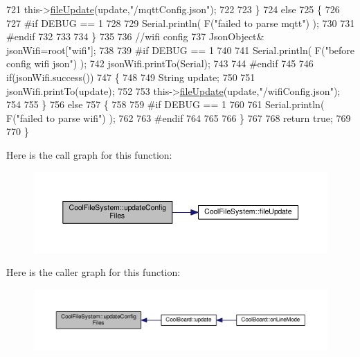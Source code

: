 \begin{DoxyCode}
721         this->\hyperlink{class_cool_file_system_a13f2958f5b87757c31fc53797a30d23a}{fileUpdate}(update,\textcolor{stringliteral}{"/mqttConfig.json"});      
722 
723     \}
724     \textcolor{keywordflow}{else}
725     \{
726 
727 \textcolor{preprocessor}{    #if DEBUG == 1 }
728 
729         Serial.println( F(\textcolor{stringliteral}{"failed to parse mqtt"}) );
730     
731 \textcolor{preprocessor}{    #endif}
732 
733     
734     \}   
735 
736     \textcolor{comment}{//wifi config}
737         JsonObject& jsonWifi=root[\textcolor{stringliteral}{"wifi"}];
738     
739 \textcolor{preprocessor}{#if DEBUG == 1 }
740 
741     Serial.println( F(\textcolor{stringliteral}{"before config wifi json"}) );
742     jsonWifi.printTo(Serial);
743 
744 \textcolor{preprocessor}{#endif}
745 
746     \textcolor{keywordflow}{if}(jsonWifi.success())
747     \{
748 
749         String update;
750     
751         jsonWifi.printTo(update);
752 
753         this->\hyperlink{class_cool_file_system_a13f2958f5b87757c31fc53797a30d23a}{fileUpdate}(update,\textcolor{stringliteral}{"/wifiConfig.json"});      
754 
755     \}
756     \textcolor{keywordflow}{else}
757     \{
758 
759 \textcolor{preprocessor}{    #if DEBUG == 1 }
760 
761         Serial.println( F(\textcolor{stringliteral}{"failed to parse wifi"}) );
762     
763 \textcolor{preprocessor}{    #endif}
764 
765     
766     \}   
767         
768     \textcolor{keywordflow}{return} \textcolor{keyword}{true};
769 
770 \}   
\end{DoxyCode}
Here is the call graph for this function\+:\nopagebreak
\begin{figure}[H]
\begin{center}
\leavevmode
\includegraphics[width=350pt]{db/d0c/class_cool_file_system_adfa8e2e80641ae6f0cceabd348a9b841_cgraph}
\end{center}
\end{figure}
Here is the caller graph for this function\+:\nopagebreak
\begin{figure}[H]
\begin{center}
\leavevmode
\includegraphics[width=350pt]{db/d0c/class_cool_file_system_adfa8e2e80641ae6f0cceabd348a9b841_icgraph}
\end{center}
\end{figure}



